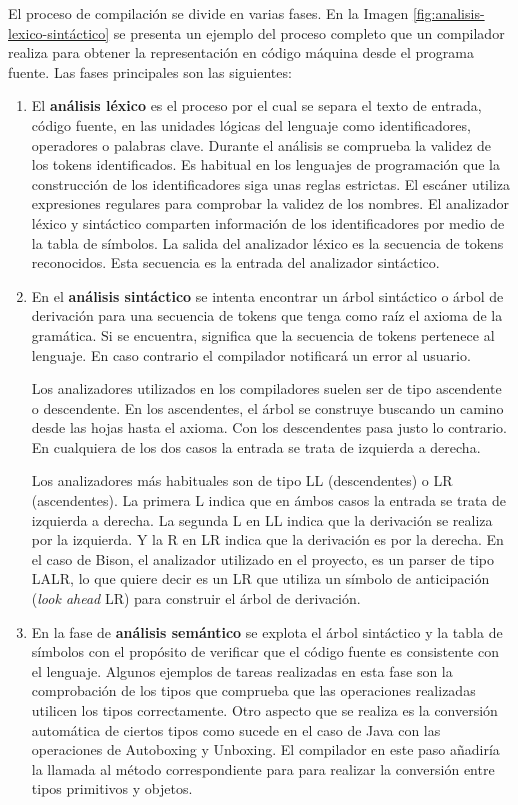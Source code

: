 El proceso de compilación se divide en varias fases. En la Imagen \ref{fig:analisis-lexico-sintáctico} se presenta un ejemplo del proceso completo que un compilador realiza para obtener la representación en código máquina desde el programa fuente. Las fases principales son las siguientes:

\begin{enumerate}
    \item El \textbf{análisis léxico} es el proceso por el cual se separa el texto de entrada, código fuente, en las unidades lógicas del lenguaje como identificadores, operadores o palabras clave. 
    Durante el análisis se comprueba la validez de los tokens identificados. Es habitual en los lenguajes de programación que la construcción de los identificadores siga unas reglas estrictas. El escáner utiliza expresiones regulares para comprobar la validez de los nombres.
    El analizador léxico y sintáctico comparten información de los identificadores por medio de la tabla de símbolos.
    La salida del analizador léxico es la secuencia de tokens reconocidos. Esta secuencia es la entrada del analizador sintáctico.
    
    \item En el \textbf{análisis sintáctico} se intenta encontrar un árbol sintáctico o árbol de derivación para una secuencia de tokens que tenga como raíz el axioma de la gramática. Si se encuentra, significa que la secuencia de tokens pertenece al lenguaje. En caso contrario el compilador notificará un error al usuario.
    
    Los analizadores utilizados en los compiladores suelen ser de tipo ascendente o descendente. En los ascendentes, el árbol se construye buscando un camino desde las hojas hasta el axioma. Con los descendentes pasa justo lo contrario. En cualquiera de los dos casos la entrada se trata de izquierda a derecha. 
    
    Los analizadores más habituales son de tipo LL (descendentes) o LR (ascendentes). La primera L indica que en ámbos casos la entrada se trata de izquierda a derecha. La segunda L en LL indica que la derivación se realiza por la izquierda. Y la R en LR indica que la derivación es por la derecha. En el caso de Bison, el analizador utilizado en el proyecto, es un parser de tipo LALR, lo que quiere decir es un LR que utiliza un símbolo de anticipación (\emph{look ahead} LR) para construir el árbol de derivación. 

    \item En la fase de \textbf{análisis semántico} se explota el árbol sintáctico y la tabla de símbolos con el propósito de verificar que el código fuente es consistente con el lenguaje. Algunos ejemplos de tareas realizadas en esta fase son la comprobación de los tipos que comprueba que las operaciones realizadas utilicen los tipos correctamente. Otro aspecto que se realiza es la conversión automática de ciertos tipos como sucede en el caso de Java con las operaciones de Autoboxing y Unboxing. El compilador en este paso añadiría la llamada al método correspondiente para para realizar la conversión entre tipos primitivos y objetos.
    

\end{enumerate}
